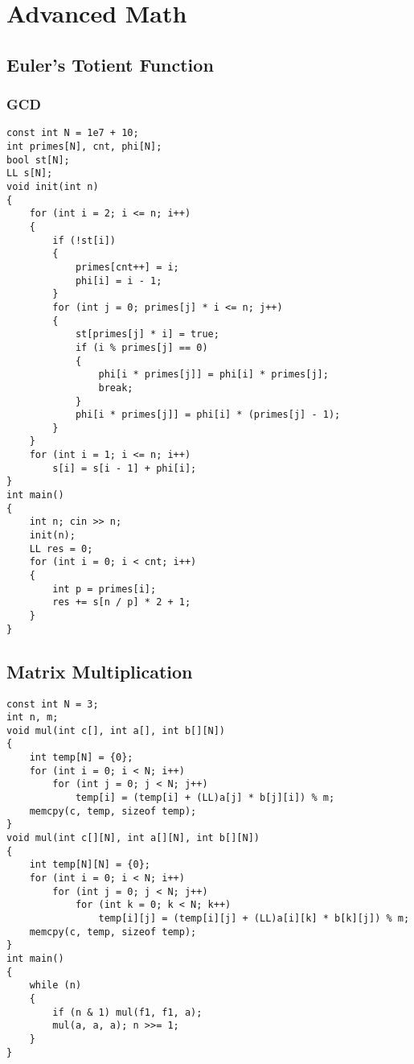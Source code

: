 \chapter{Advanced Math}\label{chap:AdvancedMath}
\section{Euler's Totient Function}
\subsection{GCD}
\begin{lstlisting}
const int N = 1e7 + 10;
int primes[N], cnt, phi[N];
bool st[N];
LL s[N];
void init(int n)
{
    for (int i = 2; i <= n; i++)
    {
        if (!st[i])
        {
            primes[cnt++] = i;
            phi[i] = i - 1;
        }
        for (int j = 0; primes[j] * i <= n; j++)
        {
            st[primes[j] * i] = true;
            if (i % primes[j] == 0)
            {
                phi[i * primes[j]] = phi[i] * primes[j];
                break;
            }
            phi[i * primes[j]] = phi[i] * (primes[j] - 1);
        }
    }
    for (int i = 1; i <= n; i++)
        s[i] = s[i - 1] + phi[i];
}
int main()
{
    int n; cin >> n;
    init(n);
    LL res = 0;
    for (int i = 0; i < cnt; i++)
    {
        int p = primes[i];
        res += s[n / p] * 2 + 1;
    }
}
\end{lstlisting}
\section{Matrix Multiplication}
\begin{lstlisting}
const int N = 3;
int n, m;
void mul(int c[], int a[], int b[][N])
{
    int temp[N] = {0};
    for (int i = 0; i < N; i++)
        for (int j = 0; j < N; j++)
            temp[i] = (temp[i] + (LL)a[j] * b[j][i]) % m;
    memcpy(c, temp, sizeof temp);
}
void mul(int c[][N], int a[][N], int b[][N])
{
    int temp[N][N] = {0};
    for (int i = 0; i < N; i++)
        for (int j = 0; j < N; j++)
            for (int k = 0; k < N; k++)
                temp[i][j] = (temp[i][j] + (LL)a[i][k] * b[k][j]) % m;
    memcpy(c, temp, sizeof temp);
}
int main()
{
    while (n)
    {
        if (n & 1) mul(f1, f1, a);
        mul(a, a, a); n >>= 1;
    }
}
\end{lstlisting}